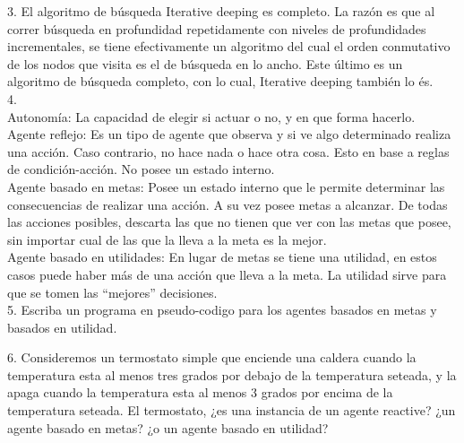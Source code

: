 3. El algoritmo de búsqueda Iterative deeping es completo. La razón es que al correr búsqueda en profundidad repetidamente con niveles de profundidades incrementales, se tiene efectivamente un algoritmo del cual el orden conmutativo de los nodos que visita es el de búsqueda en lo ancho. Este último es un algoritmo de búsqueda completo, con lo cual, Iterative deeping también lo és.\\

4.\\

Autonomía: La capacidad de elegir si actuar o no, y en que forma hacerlo.\\

Agente reflejo: Es un tipo de agente que observa y si ve algo determinado realiza una acción. Caso contrario, no hace nada o hace otra cosa. Esto en base a reglas de condición-acción. No posee un estado interno. \\

Agente basado en metas: Posee un estado interno que le permite determinar las consecuencias de realizar una acción. A su vez posee metas a alcanzar. De todas las acciones posibles, descarta las que no tienen que ver con las metas que posee, sin importar cual de las que la lleva a la meta es la mejor. \\

Agente basado en utilidades: En lugar de metas se tiene una utilidad, en estos casos puede haber más de una acción que lleva a la meta. La utilidad sirve para que se tomen las “mejores” decisiones.\\


5. Escriba un programa en pseudo-codigo para los agentes basados en metas y basados en utilidad.

6. Consideremos un termostato simple que enciende una caldera cuando la temperatura esta al menos tres grados por debajo de la temperatura seteada, y la apaga cuando la temperatura esta al menos 3 grados por encima de la temperatura seteada. El termostato, ¿es una instancia de un agente reactive? ¿un agente basado en metas? ¿o un agente basado en utilidad?\textbf{}

\bigskip